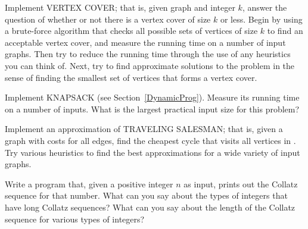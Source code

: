 \begin{projects}

\item
Implement VERTEX COVER; that is, given graph  and integer
\(k\), answer the question
of whether or not there is a vertex cover of size \(k\) or less.
Begin by using a brute-force algorithm that checks all possible
sets of vertices of size \(k\) to find an acceptable vertex cover,
and measure the running time on a number of input graphs.
Then try to reduce the running time through the use of any heuristics
you can think of.
Next, try to find approximate solutions to the problem in the sense of
finding the smallest set of vertices that forms a vertex cover.

\item
Implement KNAPSACK
(see Section~\ref{DynamicProg}).
Measure its running time on a number of inputs.
What is the largest practical input size for this problem?

\item
Implement an approximation of
TRAVELING SALESMAN; that
is, given a graph  with costs for all edges, find the cheapest
cycle that visits all vertices in .
Try various heuristics to find the best approximations for a wide
variety of input graphs.

\item
Write a program that, given a positive integer \(n\) as input, prints
out the Collatz sequence for that number.
What can you say about the types of integers that have long Collatz
sequences?
What can you say about the length of the Collatz sequence for various
types of integers?
\end{projects}
